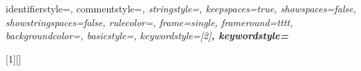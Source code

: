 {	%
	identifierstyle=\color{black}\footnotesize\ttfamily,
	commentstyle=\color{ipython-cyan}\footnotesize\itshape\ttfamily,
	stringstyle=\color{ipython-red}\footnotesize\ttfamily,
	keepspaces=true,
	showspaces=false,
	showstringspaces=false,
	rulecolor=\color{ipython-frame},
	frame=single,
	frameround={t}{t}{t}{t},
	backgroundcolor=\color{ipython-bg},
	basicstyle=\footnotesize\ttfamily,
	keywordstyle=[2]\color{ipython-green}\bfseries\footnotesize\ttfamily, 
	keywordstyle=\color{ipython-purple}\bfseries\footnotesize\ttfamily
}

[1][]{\lstset{language=iPython,mathescape=true}%
}{%
}

